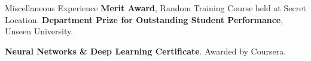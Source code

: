 \begin{rubric}{Miscellaneous Experience}
\entry*[2002] \textbf{Merit Award}, Random Training Course held at Secret Location.
%
\entry*[2001] \textbf{Department Prize for Outstanding Student Performance}, Unseen University.

\entry*[2006] \textbf{Neural Networks \& Deep Learning Certificate}. Awarded by Coursera.

\end{rubric}